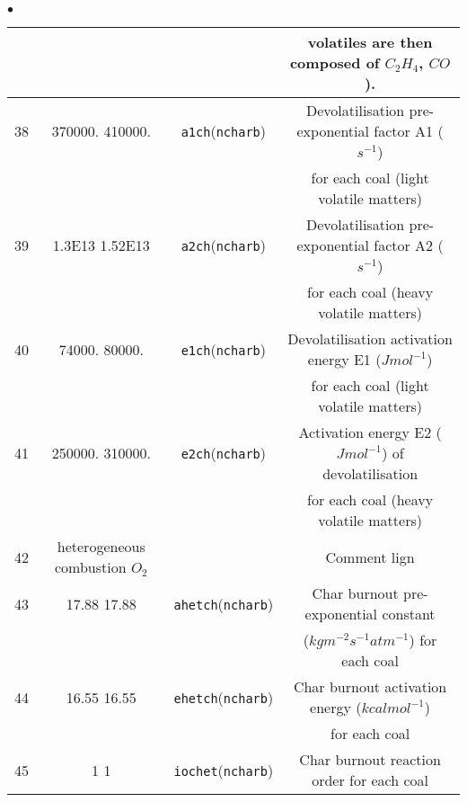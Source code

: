 {{{\begin{list}{$\bullet$}{}
\begin{table}[htbp]
\begin{center}
{\begin{tabular}{|c|c|c|c|}
        &                                &                               & volatiles are then composed of {$C_{2}H_{4}$}, {$CO$}).\\ \hline
  38    &  370000.      410000.          & \texttt{a1ch\index{a1ch}}(\texttt{ncharb})& Devolatilisation pre-exponential factor A1 ($s^{-1}$)\\
        &                                &                               & for each coal (light volatile matters)               \\ \hline
  39    &  1.3E13       1.52E13          & \texttt{a2ch\index{a2ch}}(\texttt{ncharb})& Devolatilisation pre-exponential factor A2 ($s^{-1}$)\\
        &                                &                               & for each coal (heavy volatile matters)               \\ \hline
  40    &   74000.       80000.          & \texttt{e1ch\index{e1ch}}(\texttt{ncharb})& Devolatilisation activation energy E1 ($Jmol^{-1}$)  \\
        &                                &                               & for each coal (light volatile matters)               \\ \hline
  41    &  250000.      310000.          & \texttt{e2ch\index{e2ch}}(\texttt{ncharb})& Activation energy E2 ($Jmol^{-1}$) of devolatilisation\\
        &                                &                               & for each coal (heavy volatile matters)               \\ \hline
  42    &  heterogeneous combustion $O_2$   &                               & Comment lign                                 \\ \hline
  43    &      17.88        17.88        & \texttt{ahetch\index{ahetch}}(\texttt{ncharb})   & Char burnout pre-exponential constant                \\
        &                                &                               & ($kgm^{-2}s^{-1}atm^{-1}$) for each coal             \\ \hline
  44    &      16.55        16.55        & \texttt{ehetch\index{ehetch}}(\texttt{ncharb})   & Char burnout activation energy ($kcalmol^{-1}$)       \\
        &                                &                               & for each coal                                        \\ \hline
  45    &       1            1           & \texttt{iochet\index{iochet}}(\texttt{ncharb})   & Char burnout reaction order for each coal            \\

\end{tabular}}
\end{center}
\end{table}
\end{list}}}}
